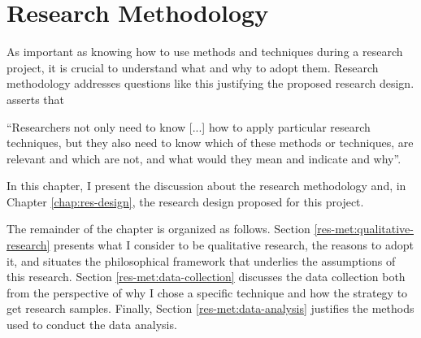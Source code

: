 \chapter{Research Methodology}
\label{chap:res-methodology}

As important as knowing how to use methods and techniques during a research project, it is crucial to understand what and why to adopt them. Research methodology addresses questions like this justifying the proposed research design.  asserts that 
\begin{citacao}
    “Researchers not only need to know [...] how to apply particular research techniques, but they also need to know which of these methods or techniques, are relevant and which are not, and what would they mean and indicate and why”.
\end{citacao}
In this chapter, I present the discussion about the research methodology and, in Chapter \ref{chap:res-design}, the research design proposed for this project.

The remainder of the chapter is organized as follows. Section \ref{res-met:qualitative-research} presents what I consider to be qualitative research, the reasons to adopt it, and situates the philosophical framework that underlies the assumptions of this research. Section \ref{res-met:data-collection} discusses the data collection both from the perspective of why I chose a specific technique and how the strategy to get research samples. Finally, Section \ref{res-met:data-analysis} justifies the methods used to conduct the data analysis.

